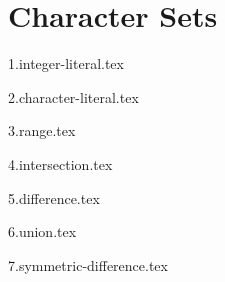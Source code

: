 
\section{Character Sets}
\label{subsec:charset}
{
	\lipsum[1]
	
	{1.integer-literal.tex}
	
	{2.character-literal.tex}
	
	{3.range.tex}
	
	{4.intersection.tex}
	
	{5.difference.tex}
	
	{6.union.tex}
	
	{7.symmetric-difference.tex}
}

